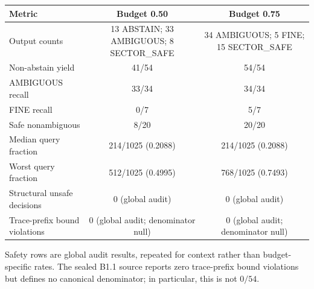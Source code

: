 \begin{tabular}{lcc}
\toprule
Metric & Budget 0.50 & Budget 0.75 \\
\midrule
Output counts & 13 ABSTAIN; 33 AMBIGUOUS; 8 SECTOR_SAFE & 34 AMBIGUOUS; 5 FINE; 15 SECTOR_SAFE \\
Non-abstain yield & 41/54 & 54/54 \\
AMBIGUOUS recall & 33/34 & 34/34 \\
FINE recall & 0/7 & 5/7 \\
Safe nonambiguous & 8/20 & 20/20 \\
Median query fraction & 214/1025 (0.2088) & 214/1025 (0.2088) \\
Worst query fraction & 512/1025 (0.4995) & 768/1025 (0.7493) \\
Structural unsafe decisions & 0 (global audit) & 0 (global audit) \\
Trace-prefix bound violations & 0 (global audit; denominator null) & 0 (global audit; denominator null) \\
\bottomrule
\end{tabular}
\par\footnotesize Safety rows are global audit results, repeated for context rather than budget-specific rates. The sealed B1.1 source reports zero trace-prefix bound violations but defines no canonical denominator; in particular, this is not $0/54$.
